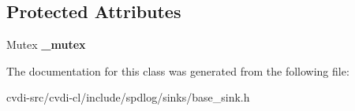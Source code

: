 \subsection*{Protected Attributes}
\begin{DoxyCompactItemize}
\item 
Mutex {\bfseries \+\_\+mutex}\hypertarget{classspdlog_1_1sinks_1_1base__sink_a1b380f67a77db4c384f9d02d7671e8a0}{}\label{classspdlog_1_1sinks_1_1base__sink_a1b380f67a77db4c384f9d02d7671e8a0}

\end{DoxyCompactItemize}


The documentation for this class was generated from the following file\+:\begin{DoxyCompactItemize}
\item 
cvdi-\/src/cvdi-\/cl/include/spdlog/sinks/base\+\_\+sink.\+h\end{DoxyCompactItemize}
